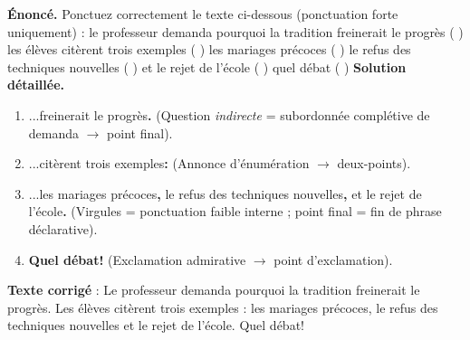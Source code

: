 \documentclass[11pt]{article}
\begin{document}
\begin{exoresolu}
\textbf{Énoncé.} Ponctuez correctement le texte ci-dessous (ponctuation forte uniquement) :
\og le professeur demanda pourquoi la tradition freinerait le progrès ( ) les élèves citèrent trois exemples ( ) les mariages précoces ( ) le refus des techniques nouvelles ( ) et le rejet de l'école ( ) quel débat ( ) \fg{}
\tcblower
\textbf{Solution détaillée.}
\begin{enumerate}
\item \og ...freinerait le progrès\textbf{.} \fg{} (Question \emph{indirecte} = subordonnée complétive de \og demanda \fg{} $\rightarrow$ point final).
\item \og ...citèrent trois exemples\textbf{:} \fg{} (Annonce d'énumération $\rightarrow$ deux-points).
\item \og ...les mariages précoces\textbf{,} le refus des techniques nouvelles\textbf{,} et le rejet de l'école\textbf{.} \fg{} (Virgules = ponctuation faible interne ; point final = fin de phrase déclarative).
\item \og \textbf{Quel débat!} \fg{} (Exclamation admirative $\rightarrow$ point d'exclamation).
\end{enumerate}
\textbf{Texte corrigé} : \og Le professeur demanda pourquoi la tradition freinerait le progrès. Les élèves citèrent trois exemples : les mariages précoces, le refus des techniques nouvelles et le rejet de l'école. Quel débat! \fg{}
\end{exoresolu}
\end{document}
